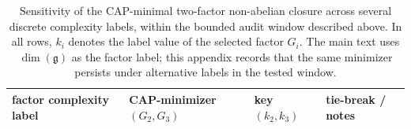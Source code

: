 \begin{table}[H]
\centering
\scriptsize
\setlength{\tabcolsep}{6pt}
\renewcommand{\arraystretch}{1.15}
\begin{tabular}{llll}
\toprule
factor complexity label & CAP-minimizer $(G_2,G_3)$ & key $(k_2,k_3)$ & tie-break / notes \\
\midrule
%
\end{tabular}
\caption{Sensitivity of the CAP-minimal two-factor non-abelian closure across several discrete complexity labels, within the bounded audit window described above.
In all rows, $k_i$ denotes the label value of the selected factor $G_i$.
The main text uses $\dim(\mathfrak{g})$ as the factor label; this appendix records that the same minimizer persists under alternative labels in the tested window.}
\label{tab:gauge_complexity_sensitivity}
\end{table}

